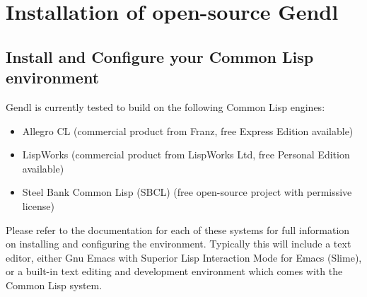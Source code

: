 \documentclass [11pt]{book}
\begin{document}
\section{Installation of open-source Gendl}

\label{sec:installationofopen-sourcegendl}



\subsection{Install and Configure your Common Lisp environment}

\label{subsec:installandconfigureyourcommonlispenvironment}

Gendl is currently tested to build on the following Common Lisp engines:

\begin{itemize}

\item Allegro CL (commercial product from Franz, free Express Edition available)

\item LispWorks (commercial product from LispWorks Ltd, free Personal Edition available)

\item Steel Bank Common Lisp (SBCL) (free open-source project with permissive license)

\end{itemize}

Please refer to the documentation for each of these systems for full information on installing 
and configuring the environment. Typically this will include a text editor, either Gnu Emacs with Superior
Lisp Interaction Mode for Emacs (Slime), or a built-in text editing and development environment which 
comes with the Common Lisp system.

\backmatter



\printindex
\end{document}
